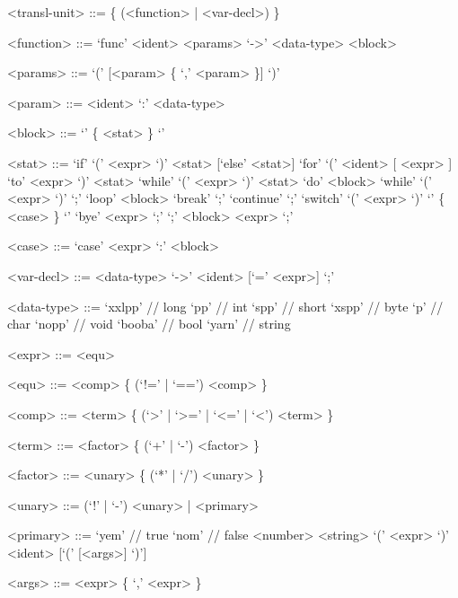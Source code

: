 \documentclass[12pt, a4paper]{article}
\begin{document}
    \setlength{\grammarparsep}{0.6em} %
    \setlength{\grammarindent}{10em} %

    \begin{grammar}

        <transl-unit> ::= \{ (<function> | <var-decl>) \}

        <function> ::= `func' <ident> <params> `->' <data-type> <block>

        <params> ::= `(' [<param> \{ `,' <param> \}] `)'

        <param> ::= <ident> `:' <data-type>

        <block> ::= `{' \{ <stat> \} `}'

        <stat> ::= `if' `(' <expr> `)' <stat> [`else' <stat>]
        \alt `for' `(' <ident> [ <expr> ] `to' <expr> `)' <stat>
        \alt `while' `(' <expr> `)' <stat>
        \alt `do' <block> `while' `(' <expr> `)' `;'
        \alt `loop' <block>
        \alt `break' `;'
        \alt `continue' `;'
        \alt `switch' `(' <expr> `)' `{' \{ <case> \} `}'
        \alt `bye' <expr> `;'
        \alt `;'
        \alt <block>
        \alt <expr> `;'

        <case> ::= `case' <expr> `:' <block>

        <var-decl> ::= <data-type> `->' <ident> [`=' <expr>] `;'

        <data-type> ::= `xxlpp' // long
        \alt `pp' // int
        \alt `spp' // short
        \alt `xspp' // byte
        \alt `p' // char
        \alt `nopp' // void
        \alt `booba' // bool
        \alt `yarn' // string

        <expr> ::= <equ>

        <equ> ::= <comp> \{ (`!=' | `==') <comp> \}

        <comp> ::= <term> \{ (`>' | `>=' | `<=' | `<') <term> \}

        <term> ::= <factor> \{ (`+' | `-') <factor> \}

        <factor> ::= <unary> \{ (`*' | `/') <unary> \}

        <unary> ::= (`!' | `-') <unary> | <primary>

        <primary> ::= `yem' // true
        \alt `nom' // false
        \alt <number>
        \alt <string>
        \alt `(' <expr> `)'
        \alt <ident> [`(' [<args>] `)']

        <args> ::= <expr> \{ `,' <expr> \}
    \end{grammar}
\end{document}
